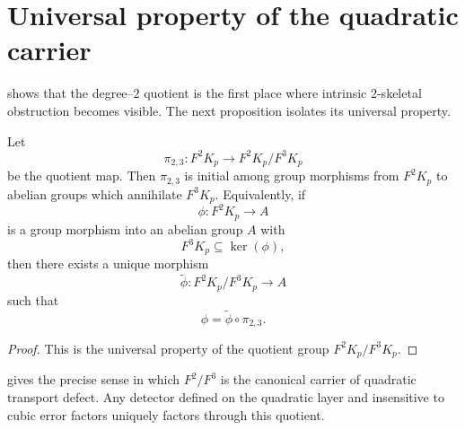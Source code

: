 \section{Universal property of the quadratic carrier}
\label{sec:interface-universal}
 shows that the degree--\(2\) quotient is the first
place where intrinsic \(2\)-skeletal obstruction becomes visible.
The next proposition isolates its universal property.
\begin{proposition}
	\label{prop:interface-universal-quadratic}
	Let
	\[
		\pi_{2,3}:F^2K_p\to F^2K_p/F^3K_p
	\]
	be the quotient map.
	Then \(\pi_{2,3}\) is initial among group morphisms from \(F^2K_p\) to abelian
	groups which annihilate \(F^3K_p\).
	Equivalently, if
	\[
		\phi:F^2K_p\to A
	\]
	is a group morphism into an abelian group \(A\) with
	\[
		F^3K_p\subseteq \ker(\phi),
	\]
	then there exists a unique morphism
	\[
		\widetilde\phi:F^2K_p/F^3K_p\to A
	\]
	such that
	\[
		\phi=\widetilde\phi\circ \pi_{2,3}.
	\]
\end{proposition}
\begin{proof}
	This is the universal property of the quotient group
	\(F^2K_p/F^3K_p\).
\end{proof}
\begin{remark}
	 gives the precise sense in
	which \(F^2/F^3\) is the canonical carrier of quadratic transport
	defect.
	Any detector defined on the quadratic layer and insensitive to cubic
	error factors uniquely factors through this quotient.
\end{remark}
